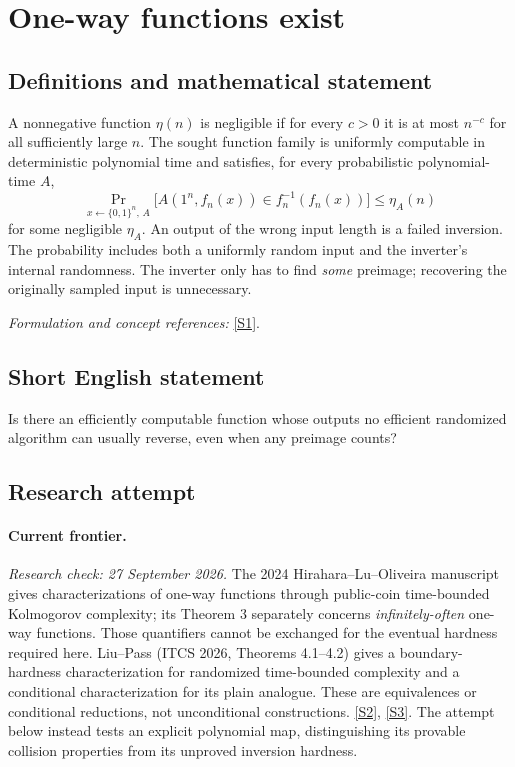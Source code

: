 \documentclass[11pt,a4paper]{article}
\newcommand{\sref}[2]{\hyperlink{source:#1:#2}{[S#2]}}
\newif\ifshowcatalogue
\newcommand{\cataloguescope}[1]{\ifshowcatalogue
 \paragraph{Exact scope in the supplied catalogue.}
 \begin{quote}\small #1\end{quote}\fi}
\begin{document}
\setcounter{section}{0}
\clearpage
\section*{\texorpdfstring{One-way functions exist}{One-way functions exist}}\label{3403}
\subsection{Definitions and mathematical statement}
A nonnegative function $\eta(n)$ is negligible if for every $c>0$ it is at most $n^{-c}$ for all sufficiently large $n$. The sought function family is uniformly computable in deterministic polynomial time and satisfies, for every probabilistic polynomial-time $A$,
\[
 \Pr_{x\leftarrow\{0,1\}^n,\,A}\!\bigl[A(1^n,f_n(x))\in f_n^{-1}(f_n(x))\bigr]
 \le \eta_A(n)
\]
for some negligible $\eta_A$. An output of the wrong input length is a failed inversion. The probability includes both a uniformly random input and the inverter's internal randomness. The inverter only has to find \emph{some} preimage; recovering the originally sampled input is unnecessary.
\par\smallskip\textit{Formulation and concept references:} \sref{3403}{1}.
\cataloguescope{Prove or disprove that there exists a deterministic polynomial-time computable function family f\_n:\{0,1\}\textasciicircum{}n->\{0,1\}\textasciicircum{}\{poly(n)\} such that every probabilistic polynomial-time algorithm inverts f\_n on a uniformly random input with only negligible probability.}
\subsection{Short English statement}
Is there an efficiently computable function whose outputs no efficient randomized algorithm can usually reverse, even when any preimage counts?
\subsection{Research attempt}
\paragraph{Current frontier.}
\textit{Research check: 27 September 2026.}
The 2024 Hirahara--Lu--Oliveira manuscript gives characterizations of
one-way functions through public-coin time-bounded Kolmogorov complexity;
its Theorem 3 separately concerns \emph{infinitely-often} one-way
functions. Those quantifiers cannot be exchanged for the eventual
hardness required here. Liu--Pass (ITCS 2026, Theorems 4.1--4.2) gives a
boundary-hardness characterization for randomized time-bounded
complexity and a conditional characterization for its plain analogue.
These are equivalences or conditional reductions, not unconditional
constructions. \sref{3403}{2}, \sref{3403}{3}.
The attempt below instead tests an explicit polynomial map, distinguishing
its provable collision properties from its unproved inversion hardness.
\end{document}
